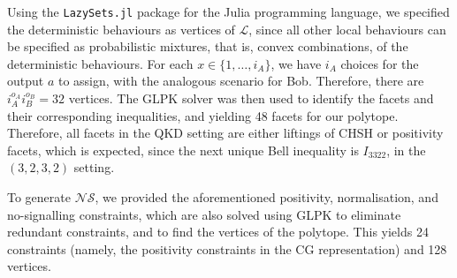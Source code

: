 \documentclass[10pt, a4paper]{article}
\numberwithin{equation}{section} %
\theoremstyle{definition}
\theoremstyle{plain}
\newcommand{\dintv}[2]{\mathopen\{#1,\ldots,#2\mathclose\}}
\newcommand{\?}{\mathrel{?}} %
\newcommand{\Ls}{\mathcal{L}}
\newcommand{\NSs}{\mathcal{NS}}
\begin{document}
      Using the \verb`LazySets.jl` package for the Julia programming language, we specified the deterministic behaviours as vertices of \(\Ls\), since all other local behaviours can be specified as probabilistic mixtures, that is, convex combinations, of the deterministic behaviours. For each \(x \in \dintv{1}{i_A}\), we have \(i_A\) choices for the output \(a\) to assign, with the analogous scenario for Bob. Therefore, there are \(i_A^{o_A}i_B^{o_B} = 32\) vertices. The GLPK solver was then used to identify the facets and their corresponding inequalities, and yielding 48 facets for our polytope. Therefore, all facets in the QKD setting are either liftings of CHSH or positivity facets, which is expected, since the next unique Bell inequality is \(I_{3322}\), in the \((3,2,3,2)\) setting.

      To generate \(\NSs\), we provided the aforementioned positivity, normalisation, and no-signalling constraints, which are also solved using GLPK to eliminate redundant constraints, and to find the vertices of the polytope. This yields 24 constraints (namely, the positivity constraints in the CG representation) and 128 vertices.
\end{document}
